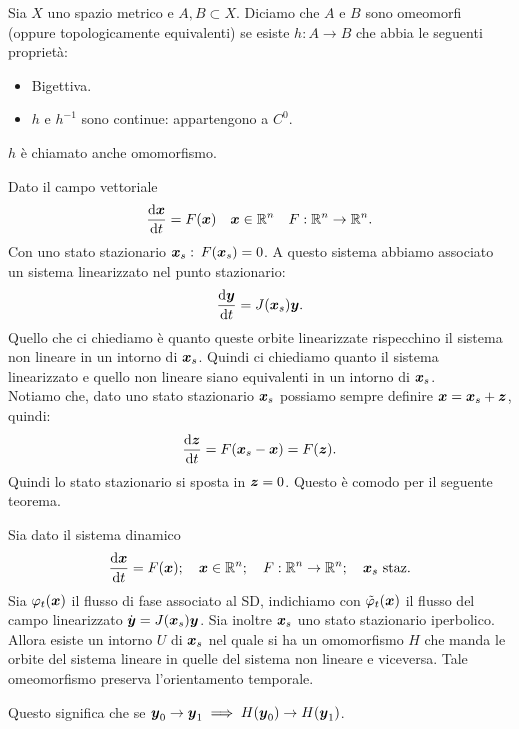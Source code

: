 \begin{defn}
    Sia $X$ uno spazio metrico e $A, B \subset X$. Diciamo che $A$ e $B$ sono omeomorfi (oppure topologicamente equivalenti) se esiste $h:A\to B$ che abbia le seguenti proprietà:
    \begin{itemize}
	\item Bigettiva.
	\item $h$ e $h^{-1}$ sono continue: appartengono a $C^0$.
    \end{itemize}
    $h$ è chiamato anche omomorfismo.
\end{defn}
\noindent
Dato il campo vettoriale 
\[
    \frac{\text{d} \boldsymbol{x}}{\text{d} t} = F(\boldsymbol{x}) \quad  \boldsymbol{x}\in \mathbb{R}^n \quad  F:\mathbb{R}^n\to \mathbb{R}^n
.\] 
Con uno stato stazionario $\boldsymbol{x}_s: $  $F(\boldsymbol{x}_s) =0$. A questo sistema abbiamo associato un sistema linearizzato nel punto stazionario:
\[
    \frac{\text{d} \boldsymbol{y}}{\text{d} t} = J(\boldsymbol{x}_s) \boldsymbol{y}
.\] 
Quello che ci chiediamo è quanto queste orbite linearizzate rispecchino il sistema non lineare in un intorno di $\boldsymbol{x}_s$. Quindi ci chiediamo quanto il sistema linearizzato e quello non lineare siano equivalenti in un intorno di $\boldsymbol{x}_s$.\\
Notiamo che, dato uno stato stazionario $\boldsymbol{x}_s$ possiamo sempre definire $\boldsymbol{x}=\boldsymbol{x}_s + \boldsymbol{z}$, quindi:
\[
    \frac{\text{d} \boldsymbol{z}}{\text{d} t} = F(\boldsymbol{x}_s - \boldsymbol{x}) = F(\boldsymbol{z}) 
.\] 
Quindi lo stato stazionario si sposta in $\boldsymbol{z}=0$. Questo è comodo per il seguente teorema.
\begin{thm}
Sia dato il sistema dinamico 
\[
    \frac{\text{d} \boldsymbol{x}}{\text{d} t} = F(\boldsymbol{x}); \quad \boldsymbol{x}\in \mathbb{R}^n; \quad F:\mathbb{R}^n\to \mathbb{R}^n; \quad \boldsymbol{x}_s \text{ staz}
.\] 
Sia $\varphi_t(\boldsymbol{x})$ il flusso di fase associato al SD, indichiamo con $\tilde{\varphi}_t(\boldsymbol{x})$ il flusso del campo linearizzato $\dot{\boldsymbol{y}}=J(\boldsymbol{x}_s) \boldsymbol{y}$. Sia inoltre $\boldsymbol{x}_s$ uno stato stazionario iperbolico.\\
Allora esiste un intorno $U$ di $\boldsymbol{x}_s$ nel quale si ha un omomorfismo $H$ che manda le orbite del sistema lineare in quelle del sistema non lineare e viceversa. 
Tale omeomorfismo preserva l'orientamento temporale.
\end{thm}
\noindent
Questo significa che se $\boldsymbol{y}_0\to \boldsymbol{y}_1 \implies  H(\boldsymbol{y}_0) \to H(\boldsymbol{y}_1)$.

